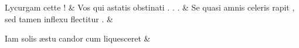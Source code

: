 \documentclass[12pt,onecolumn,twoside,a4paper]{memoir}
\begin{document}
\begin{pairs}
\begin{Leftside}
                              Lycurgam
                              cette
                              ! \&
                         \stanza {}
                     Vos
                              qui
                              astatis
                              obstinati
                              .
                              .
                              . \&
                         \stanza {}
                     Se
                              quasi
                              amnis
                              celeris
                              rapit
                              ,
                              sed
                              tamen
                              inflexu
                              flectitur
                              . \&
                         \stanza {}
                     
                              Iam
                              solis
                              æstu
                              candor
                              cum
                              liquesceret \&
                     
                  \endnumbering
		\end{Leftside}
                  \begin{Rightside}
			\beginnumbering
			\numberstanzafalse
                     

\end{Rightside}
\end{pairs}
\end{document}
